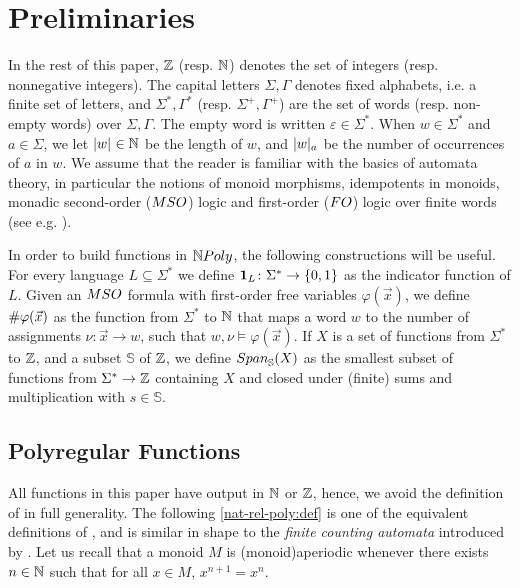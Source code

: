 \section{Preliminaries}
\label{preliminaries:sec}

\AP In the rest of this paper, $\mathbb{Z}$ (resp. $\mathbb{N}$) denotes the set of
integers (resp. nonnegative integers). The capital letters $\Sigma,\Gamma$
denotes fixed alphabets, i.e. a finite set of letters, and $\Sigma^*, \Gamma^*$
(resp. $\Sigma^+, \Gamma^+$) are the set of words (resp. non-empty words) over
$\Sigma, \Gamma$. The empty word is written $\varepsilon \in \Sigma^*$. When $w
\in \Sigma^*$ and $a \in \Sigma$, we let $\card{w} \in \Nat$ be the length of
$w$, and $\card[a]{w}$ be the number of occurrences of $a$ in $w$. We assume
that the reader is familiar with the basics of automata theory, in particular
the notions of monoid morphisms, idempotents in monoids, monadic second-order
($\MSO$) logic and first-order ($\FO$) logic over finite words (see e.g.
\cite{thomas1997languages}). 

\AP In order to build functions in $\NPoly$, the following constructions will
be useful. For every language $L \subseteq \Sigma^*$ we define $\mathbf{1}_{L} \colon
\Sigma^* \to \mathopen{\{} 0,1 \mathclose{\}}$ as the indicator function of $L$. Given an $\MSO$
formula with first-order free variables $\varphi(\vec{x})$, we define
${{\#}\varphi(\vec{x})}$ as the function from $\Sigma^*$ to $\mathbb{N}$ that maps
a word $w$ to the number of assignments $\nu \colon \vec{x} \to w$, such that
$w, \nu \models \varphi(\vec{x})$. If $X$ is a set of functions from $\Sigma^*$
to $\mathbb{Z}$, and a subset $\mathbb{S}$ of $\mathbb{Z}$, we define
$\Span{\mathbb{S}}(X)$ as the smallest subset of functions from $\Sigma^* \to
\mathbb{Z}$ containing $X$ and closed under (finite) sums and multiplication with $s
\in \mathbb{S}$.

\subsection{Polyregular Functions}

\AP All functions in this paper have output in $\mathbb{N}$ or $\mathbb{Z}$, hence, we
avoid the definition of  in full generality. The
following \cref{nat-rel-poly:def} is one of the equivalent definitions of
\cite{LOPEZ23b}, and is similar in shape to the \emph{finite counting automata}
introduced by \textcite{schutzenberger1962}. Let us recall that a monoid $M$ is
\intro(monoid){aperiodic} whenever there exists $n \in \mathbb{N}$ such that for all
$x \in M$, $x^{n+1} = x^n$.

